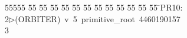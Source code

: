 %
%
\begin{tabbing}
55555 \= 55 \= 55 \= 55 \= 55 \= 55 \= 55 \= 55 \= 55 \= 55 \= 55 \= 55 \= 55 \= \>PR10:\\[0pt]
2\>$\triangleright$\>(ORBITER)\ v\ 5\ primitive\_root\ 4460190157\\[0pt]
3\>\end{tabbing}
